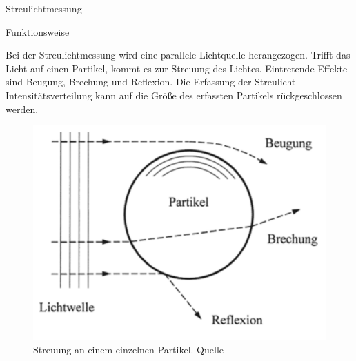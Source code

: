 \documentclass{beamer}
\begin{document}
	\begin{frame}{Streulichtmessung}
		\begin{block}{Funktionsweise}
			\begin{multicols}{2}
				\footnotesize Bei der Streulichtmessung wird eine parallele Lichtquelle herangezogen.
				Trifft das Licht auf einen Partikel, kommt es zur Streuung des Lichtes. Eintretende Effekte sind Beugung, Brechung und Reflexion.
				Die Erfassung der Streulicht-Intensitätsverteilung kann auf die Größe des erfassten Partikels rückgeschlossen werden.
				\begin{figure}
					\includegraphics[width=0.6\textheight]{streulicht.pdf}
					\caption{\footnotesize{Streuung an einem einzelnen Partikel. Quelle\cite{messtechniken}}}
				\end{figure}
			\end{multicols}
		\end{block}
	\end{frame}
\end{document}
